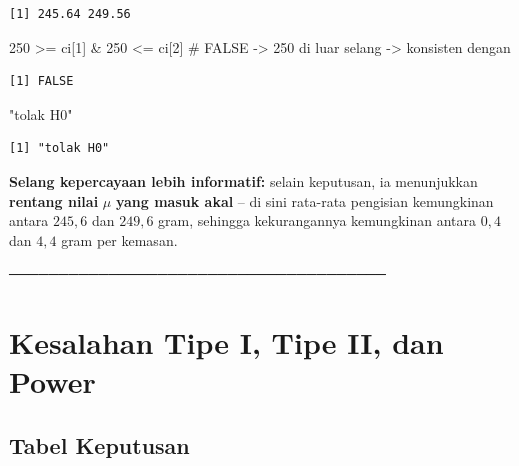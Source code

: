 \documentclass[
  indonesian,
  letterpaper,
]{book}
\newenvironment{Shaded}{\begin{snugshade}}{\end{snugshade}}
\newcommand{\CommentTok}[1]{\textcolor[rgb]{0.37,0.37,0.37}{#1}}
\newcommand{\DecValTok}[1]{\textcolor[rgb]{0.68,0.00,0.00}{#1}}
\newcommand{\NormalTok}[1]{\textcolor[rgb]{0.00,0.23,0.31}{#1}}
\newcommand{\SpecialCharTok}[1]{\textcolor[rgb]{0.37,0.37,0.37}{#1}}
\newcommand{\StringTok}[1]{\textcolor[rgb]{0.13,0.47,0.30}{#1}}
\begin{document}
\begin{verbatim}
[1] 245.64 249.56
\end{verbatim}

\begin{Shaded}
\begin{Highlighting}[]
\DecValTok{250} \SpecialCharTok{\textgreater{}=}\NormalTok{ ci[}\DecValTok{1}\NormalTok{] }\SpecialCharTok{\&} \DecValTok{250} \SpecialCharTok{\textless{}=}\NormalTok{ ci[}\DecValTok{2}\NormalTok{] }\CommentTok{\# FALSE {-}\textgreater{} 250 di luar selang {-}\textgreater{} konsisten dengan}
\end{Highlighting}
\end{Shaded}

\begin{verbatim}
[1] FALSE
\end{verbatim}

\begin{Shaded}
\begin{Highlighting}[]
\StringTok{"tolak H0"}
\end{Highlighting}
\end{Shaded}

\begin{verbatim}
[1] "tolak H0"
\end{verbatim}

\textbf{Selang kepercayaan lebih informatif:} selain keputusan, ia
menunjukkan \textbf{rentang nilai} \(\mu\) \textbf{yang masuk akal} --
di sini rata-rata pengisian kemungkinan antara \(245{,}6\) dan
\(249{,}6\) gram, sehingga kekurangannya kemungkinan antara \(0{,}4\)
dan \(4{,}4\) gram per kemasan.

──────────────────────────────────────

\section{Kesalahan Tipe I, Tipe II, dan
Power}\label{kesalahan-tipe-i-tipe-ii-dan-power}

\subsection{Tabel Keputusan}\label{tabel-keputusan}
\end{document}
